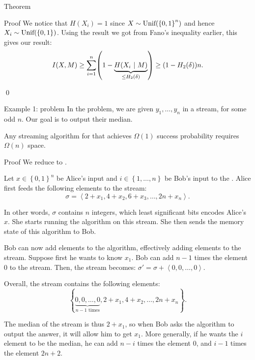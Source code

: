 \documentclass[a4paper]{article}
\begin{document}
\begin{parag}{Theorem}
\begin{subparag}{Proof}
        We notice that $H\left(X_i\right) = 1$ since $X \followsdistr \text{Unif}\left(\left\{0, 1\right\}^n\right)$ and hence $X_i \followsdistr \text{Unif}\left(\left\{0, 1\right\}\right)$. Using the result we got from Fano's inequality earlier, this gives our result:
        \[I\left(X, M\right) \geq \sum_{i=1}^{n} \left(1 - \underbrace{H\left(X_i \suchthat M\right)}_{\leq H_2\left(\delta\right)}\right) \geq \left(1 - H_2\left(\delta\right)\right)n.\]

        \qed
    \end{subparag}
\end{parag}

\begin{parag}{Example 1:  problem}
    In the  problem, we are given $y_1, \ldots, y_n$ in a stream, for some odd $n$. Our goal is to output their median.

    Any streaming algorithm for  that achieves $\Omega\left(1\right)$ success probability requires $\Omega\left(n\right)$ space.

    \begin{subparag}{Proof}
        We reduce  to . 

        Let $x \in \left\{0, 1\right\}^n$ be Alice's input and $i \in \left\{1, \ldots, n\right\}$ be Bob's input to the . Alice first feeds the following elements to the stream: 
        \[\sigma = \left\langle 2 + x_1, 4 + x_2, 6 + x_3, \ldots, 2n + x_n \right\rangle.\]
        
        In other words, $\sigma$ contains $n$ integers, which least significant bits encodes Alice's $x$. She starts running the  algorithm on this stream. She then sends the memory state of this algorithm to Bob.  

        Bob can now add elements to the algorithm, effectively adding elements to the stream. Suppose first he wants to know $x_1$. Bob can add $n-1$ times the element $0$ to the stream. Then, the stream becomes:
        $\sigma' = \sigma + \left\langle 0, 0, \ldots, 0 \right\rangle.$

        Overall, the stream contains the following elements: 
        \[\left\{\underbrace{0, 0, \ldots, 0}_{\text{$n - 1$ times}}, 2 + x_1, 4 + x_2, \ldots, 2n + x_n\right\}.\]
        
        The median of the stream is thus $2 + x_1$, so when Bob asks the algorithm to output the answer, it will allow him to get $x_1$. More generally, if he wants the $i$\Th element to be the median, he can add $n-i$ times the element $0$, and $i-1$ times the element $2n + 2$. 


\end{subparag}
\end{parag}
\end{document}
